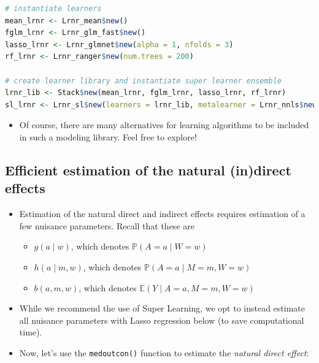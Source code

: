 \documentclass[
  12pt,
]{book}
\newcommand{\passthrough}[1]{#1}
\providecommand{\tightlist}{%
  \setlength{\itemsep}{0pt}\setlength{\parskip}{0pt}}
\theoremstyle{definition}
\theoremstyle{definition}
\theoremstyle{definition}
\renewcommand{\P}{\mathbb{P}}
\newcommand{\E}{\mathbb{E}}
\newcommand{\1}{\mathbbm{1}}
\begin{document}
\begin{lstlisting}[language=R]
# instantiate learners
mean_lrnr <- Lrnr_mean$new()
fglm_lrnr <- Lrnr_glm_fast$new()
lasso_lrnr <- Lrnr_glmnet$new(alpha = 1, nfolds = 3)
rf_lrnr <- Lrnr_ranger$new(num.trees = 200)

# create learner library and instantiate super learner ensemble
lrnr_lib <- Stack$new(mean_lrnr, fglm_lrnr, lasso_lrnr, rf_lrnr)
sl_lrnr <- Lrnr_sl$new(learners = lrnr_lib, metalearner = Lrnr_nnls$new())
\end{lstlisting}

\begin{itemize}
\tightlist
\item
  Of course, there are many alternatives for learning algorithms to be included
  in such a modeling library. Feel free to explore!
\end{itemize}

\hypertarget{efficient-estimation-of-the-natural-indirect-effects}{%
\subsection{Efficient estimation of the natural (in)direct effects}\label{efficient-estimation-of-the-natural-indirect-effects}}

\begin{itemize}
\tightlist
\item
  Estimation of the natural direct and indirect effects requires estimation of a
  few nuisance parameters. Recall that these are

  \begin{itemize}
  \tightlist
  \item
    \(g(a\mid w)\), which denotes \(\P(A=a \mid W=w)\)
  \item
    \(h(a\mid m, w)\), which denotes \(\P(A=a \mid M=m, W=w)\)
  \item
    \(b(a, m, w)\), which denotes \(\E(Y \mid A=a, M=m, W=w)\)
  \end{itemize}
\item
  While we recommend the use of Super Learning, we opt to instead estimate all
  nuisance parameters with Lasso regression below (to save computational time).
\item
  Now, let's use the \passthrough{\lstinline!medoutcon()!} function to estimate the \emph{natural direct
  effect}:
\end{itemize}
\end{document}
